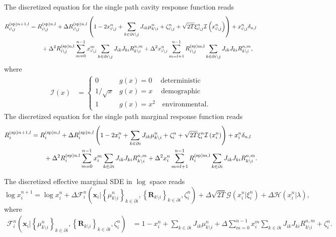 \documentclass[
    preprint,
    linenumbers,
    amsmath,amssymb,amsfonts,
    aps, physrev,
    superscriptaddress,
    10pt,
    bibnotes
    ]{revtex4-2}
\begin{document}
The discretized equation for the single path cavity response function reads
\begin{align}
  R^{({\rm sp})n+1,l}_{i\setminus j}&=R^{({\rm sp})n,l}_{i\setminus j}+\Delta R^{({\rm sp})n,l}_{i\setminus j}\left(1-2x^n_{i\setminus j} + \sum_{k\in\partial i \setminus j}J_{ik}\mu_{k\setminus i}^n+\zeta^n_{i\setminus j} + \sqrt{2T}\xi_{i\setminus j}^n\mathcal{I}\left(x_{i\setminus j}^n\right) \right)+x^n_{i\setminus j}\delta_{n,l}\nonumber\\
  &\qquad + \Delta^2 R^{(\rm sp)n,l}_{i\setminus j}\sum_{m=0}^{n-1}x_{i\setminus j}^m\sum_{k \in \partial i \setminus j}J_{ik}J_{ki} R_{k\setminus i}^{n,m} + \Delta^2 x_{i\setminus j}^n\sum_{m=l+1}^{n-1}R^{(\rm sp)m,l}_{i\setminus j}\sum_{k\in \partial i \setminus j}J_{ik}J_{ki} R_{k\setminus i}^{n,m}, \label{eq:single_path_response_discrete}
\end{align}
where
\begin{align}
  \mathcal{I}\left(x\right) & = \begin{cases}
    0 & g(x) = 0 \quad \ \text{deterministic}\\
    1/\sqrt{x} & g(x) = x \quad \ \text{demographic}\\
    1 & g(x) = x^2 \quad \text{environmental}.
  \end{cases}
\end{align}
The discretized equation for the single path marginal response function reads
\begin{align}
  R^{({\rm sp})n+1,l}_{i}&=R^{({\rm sp})n,l}_{i}+\Delta R^{({\rm sp})n,l}_{i}\left(1-2x^n_{i} + \sum_{k\in\partial i}J_{ik}\mu_{k\setminus i}^n+\zeta^n_{i} + \sqrt{2T}\xi_{i}^n\mathcal{I}\left(x_{i}^n\right) \right)+x^n_{i}\delta_{n,l}\nonumber\\
  &\qquad + \Delta^2 R^{(\rm sp)n,l}_{i}\sum_{m=0}^{n-1}x_{i}^m\sum_{k \in \partial i}J_{ik}J_{ki} R_{k\setminus i}^{n,m} + \Delta^2 x_{i}^n\sum_{m=l+1}^{n-1}R^{(\rm sp)m,l}_{i}\sum_{k\in \partial i}J_{ik}J_{ki} R_{k\setminus i}^{n,m}. \label{eq:single_path_response_marg_discrete}
\end{align}

The discretized effective marginal SDE in $\log$ space reads
\begin{equation}\label{eq:log_eff_marg_discrete}
  \log x_{i}^{n+1} = \log x_{i}^n + \Delta \mathcal{F}^n_{i}\left(\bm{x}_{i}\Big|\left\{\mu^n_{k\setminus i}\right\}_{k\in \partial i},\left\{\bm{R}_{k\setminus i}\right\}_{k\in \partial i},\zeta_{i}^n\right) + \Delta\sqrt{2T}\mathcal{G}\left(x_{i}^n\big|\xi_{i}^n\right) + \Delta \mathcal{H}\left(x_{i}^n\big|\lambda\right),
\end{equation}
where
\begin{align}
  \mathcal{F}^n_{i}\left(\bm{x}_{i}\Big|\left\{\mu^n_{k\setminus i}\right\}_{k\in \partial i},\left\{\bm{R}_{k\setminus i}\right\}_{k\in \partial i},\zeta_{i}^n\right) & = 1-x_{i}^n+\sum_{k\in \partial i}J_{ik}\mu^n_{k\setminus i} + \Delta \sum_{m=0}^{n-1} x_{i}^{m} \sum_{k \in \partial i} J_{ik}J_{ki}R_{k\setminus i}^{n,m} + \zeta_{i}^n.
\end{align}
\end{document}
